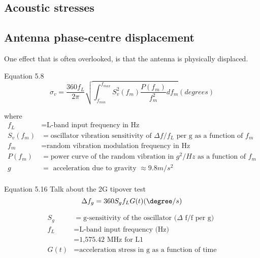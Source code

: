 \subsection{Acoustic stresses}


\subsection{Antenna phase-centre displacement}
One effect that is often overlooked, is that the antenna is physically displaced.


Equation 5.8
\begin{equation}
\sigma_v = \frac{360f_L}{2\pi}\sqrt{\int_{f_{min}}^{f_{max}} S^2_v(f_m) \frac{P(f_m)}{f^2_m} df_m} (degrees)
\end{equation}

where
\begin{align*}
f_L &= \text{L-band input frequency in Hz} \\
S_v(f_m) &= \text{oscillator vibration sensitivity of } \Delta f/f_L \text{ per g as a function of } f_m \\
f_m &= \text{random vibration modulation frequency in Hz} \\
P(f_m) &= \text{power curve of the random vibration in } g^2/Hz \text{ as a function of } f_m \\
g &= \text{ acceleration due to gravity } \approx 9.8 m/s^2\\
\end{align*}


Equation 5.16
Talk about the 2G tipover test
\begin{equation}
\Delta f_g = 360 S_g f_L G(t) (\degree/s)
\end{equation}

\begin{align*}
S_g &= \text{g-sensitivity of the oscillator } (\Delta \text{ f/f per g)}\\ 
f_L &= \text{L-band input frequency (Hz)}\\
&= \text{1,575.42 MHz for L1}\\
G(t) &= \text{acceleration stress in g as a function of time}
\end{align*}


